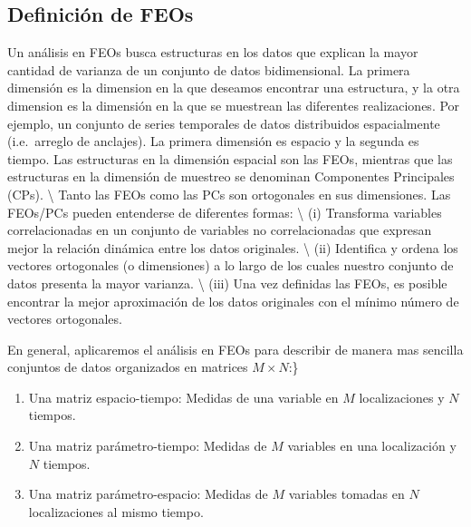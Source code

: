 \documentclass[
]{agujournal2019}
\begin{document}
\vspace{0.5cm}
\begin{center}
\end{center}

\vspace{0.25cm}

\hypertarget{definiciuxf3n-de-feos}{%
\subsection{Definición de FEOs}\label{definiciuxf3n-de-feos}}

Un análisis en FEOs busca estructuras en los datos que explican la mayor
cantidad de varianza de un conjunto de datos bidimensional. La primera
dimensión es la dimension en la que deseamos encontrar una estructura, y
la otra dimension es la dimensión en la que se muestrean las diferentes
realizaciones. Por ejemplo, un conjunto de series temporales de datos
distribuidos espacialmente (i.e.~arreglo de anclajes). La primera
dimensión es espacio y la segunda es tiempo. Las estructuras en la
dimensión espacial son las FEOs, mientras que las estructuras en la
dimensión de muestreo se denominan Componentes Principales (CPs).
\textbackslash{} Tanto las FEOs como las PCs son ortogonales en sus
dimensiones. Las FEOs/PCs pueden entenderse de diferentes formas:
\textbackslash{} (i) Transforma variables correlacionadas en un conjunto
de variables no correlacionadas que expresan mejor la relación dinámica
entre los datos originales. \textbackslash{} (ii) Identifica y ordena
los vectores ortogonales (o dimensiones) a lo largo de los cuales
nuestro conjunto de datos presenta la mayor varianza. \textbackslash{}
(iii) Una vez definidas las FEOs, es posible encontrar la mejor
aproximación de los datos originales con el mínimo número de vectores
ortogonales.

\vspace{0.25cm}

En general, aplicaremos el análisis en FEOs para describir de manera mas
sencilla conjuntos de datos organizados en matrices \(M\times N\):\}\\

\begin{enumerate}
\def\labelenumi{(\arabic{enumi})}
\item
  Una matriz espacio-tiempo: Medidas de una variable en \(M\)
  localizaciones y \(N\) tiempos.\\
\item
  Una matriz parámetro-tiempo: Medidas de \(M\) variables en una
  localización y \(N\) tiempos.\\
\item
  Una matriz parámetro-espacio: Medidas de \(M\) variables tomadas en
  \(N\) localizaciones al mismo tiempo.\\
\end{enumerate}
\end{document}
